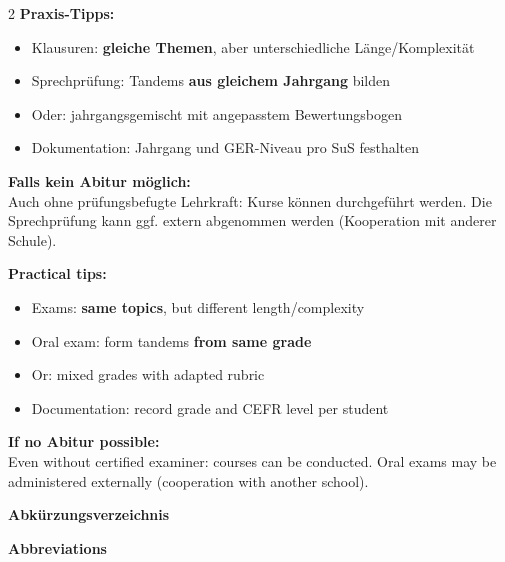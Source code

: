 \documentclass[10pt,a4paper]{article}
\newcommand{\secbil}[2]{%
\vspace{6pt}
\noindent\colorbox{spaet}{\parbox{0.48\textwidth}{\color{white}\bfseries\small #1}}%
\hfill%
\colorbox{english}{\parbox{0.48\textwidth}{\color{white}\bfseries\small #2}}
\vspace{3pt}
}
\begin{document}
\begin{paracol}{2}
\scriptsize
\textbf{Praxis-Tipps:}
\begin{itemize}[noitemsep,topsep=2pt]
\item Klausuren: \textbf{gleiche Themen}, aber unterschiedliche Länge/Komplexität
\item Sprechprüfung: Tandems \textbf{aus gleichem Jahrgang} bilden
\item Oder: jahrgangsgemischt mit angepasstem Bewertungsbogen
\item Dokumentation: Jahrgang und GER-Niveau pro SuS festhalten
\end{itemize}

\textbf{Falls kein Abitur möglich:}\\
Auch ohne prüfungsbefugte Lehrkraft: Kurse können durchgeführt werden. Die Sprechprüfung kann ggf. extern abgenommen werden (Kooperation mit anderer Schule).

\switchcolumn

\scriptsize\color{english}
\textbf{Practical tips:}
\begin{itemize}[noitemsep,topsep=2pt]
\item Exams: \textbf{same topics}, but different length/complexity
\item Oral exam: form tandems \textbf{from same grade}
\item Or: mixed grades with adapted rubric
\item Documentation: record grade and CEFR level per student
\end{itemize}

\textbf{If no Abitur possible:}\\
Even without certified examiner: courses can be conducted. Oral exams may be administered externally (cooperation with another school).

\end{paracol}


\vspace{6mm}

\vspace{4mm}
\secbil{Abkürzungsverzeichnis}{Abbreviations}

\vspace{2mm}
\end{document}
